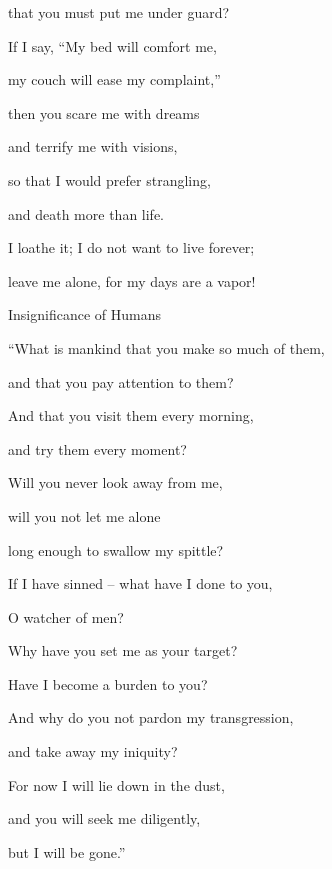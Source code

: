 {\par }{\Q that
you must put
me under
guard?
\par }{\Q {}If
I say, “My bed
will comfort
me,

\par }{\Q my couch
will ease
my complaint,”
\par }{\Q {}then you scare
me with dreams
\par }{\Q and terrify
me with visions,
\par }{\Q {}so that I would prefer strangling,
\par }{\Q and death
more than life.
\par }{\Q {}I loathe
it; I do not
want to live
forever;
\par }{\Q leave me
alone,
for
my days
are a vapor!
\par }{\SH Insignificance of Humans
\par }{\Q {}“What
is mankind
that
you make so much
of them,

\par }{\Q and that
you pay
attention
to them?
\par }{\Q {}And that you visit
them every morning,
\par }{\Q and try
them every moment?
\par }{\Q {}Will you never
look away
from
me,

\par }{\Q will you not
let
me alone
\par }{\Q long
enough to swallow
my spittle?
\par }{\Q {}If I have sinned
– what
have I done
to you,

\par }{\Q O watcher
of men?

\par }{\Q Why
have you set
me as your target?

\par }{\Q Have I become
a burden to you?
\par }{\Q {}And why
do you not
pardon
my transgression,
\par }{\Q and take
away
my iniquity?
\par }{\Q For
now
I will lie
down in the dust,
\par }{\Q and you will seek me diligently,
\par }{\Q but I will be gone.”

\par }
